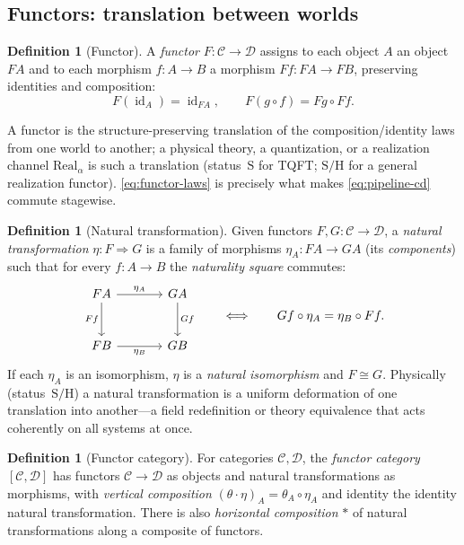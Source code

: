 \documentclass[12pt]{article}
\theoremstyle{definition}
\newtheorem{definition}[theorem]{Definition}
\theoremstyle{remark}
\newcommand{\Real}{\mathrm{Real}}
\newcommand{\id}{\operatorname{id}}
\begin{document}
\subsection{Functors: translation between worlds}

\begin{definition}[Functor]
\label{def:functor}
A \emph{functor} $F:\mathcal{C}\to\mathcal{D}$ assigns to each object $A$ an
object $FA$ and to each morphism $f:A\to B$ a morphism $Ff:FA\to FB$, preserving
identities and composition:
\begin{equation}
\label{eq:functor-laws}
F(\id_A)=\id_{FA},\qquad F(g\circ f)=Fg\circ Ff.
\end{equation}
\end{definition}

A functor is the structure-preserving translation of the composition/identity
laws from one world to another; a physical theory, a quantization, or a
realization channel $\Real_\alpha$ is such a translation (status~$\mathrm{S}$ for
TQFT; $\mathrm{S/H}$ for a general realization functor). \eqref{eq:functor-laws}
is precisely what makes \eqref{eq:pipeline-cd} commute stagewise.

\begin{definition}[Natural transformation]
\label{def:nat}
Given functors $F,G:\mathcal{C}\to\mathcal{D}$, a \emph{natural transformation}
$\eta:F\Rightarrow G$ is a family of morphisms $\eta_A:FA\to GA$ (its
\emph{components}) such that for every $f:A\to B$ the \emph{naturality square}
commutes:
\begin{equation}
\label{eq:naturality}
\begin{tikzcd}[column sep=large, row sep=large]
FA \arrow[r, "\eta_A"] \arrow[d, "Ff"'] & GA \arrow[d, "Gf"] \\
FB \arrow[r, "\eta_B"'] & GB
\end{tikzcd}
\qquad\Longleftrightarrow\qquad
Gf\circ\eta_A=\eta_B\circ Ff.
\end{equation}
If each $\eta_A$ is an isomorphism, $\eta$ is a \emph{natural isomorphism} and
$F\cong G$. Physically (status~$\mathrm{S/H}$) a natural transformation is a
uniform deformation of one translation into another---a field redefinition or
theory equivalence that acts coherently on all systems at once.
\end{definition}

\begin{definition}[Functor category]
\label{def:functor-cat}
For categories $\mathcal{C},\mathcal{D}$, the \emph{functor category}
$[\mathcal{C},\mathcal{D}]$ has functors $\mathcal{C}\to\mathcal{D}$ as objects
and natural transformations as morphisms, with \emph{vertical composition}
$(\theta\cdot\eta)_A=\theta_A\circ\eta_A$ and identity the identity natural
transformation. There is also \emph{horizontal composition} $\ast$ of natural
transformations along a composite of functors.
\end{definition}
\end{document}
